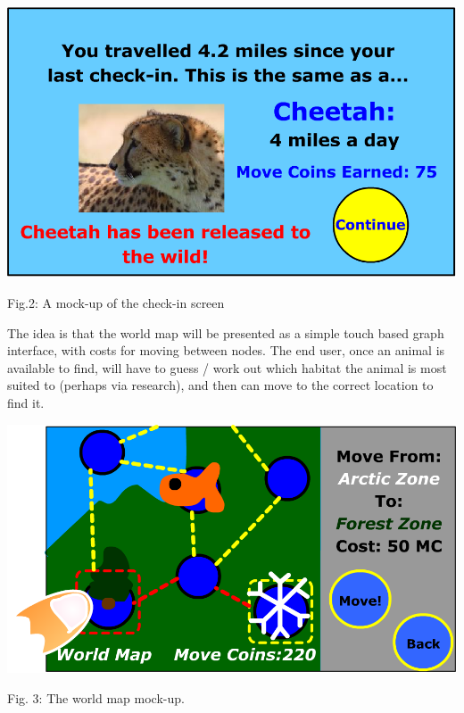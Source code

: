 \documentclass[]{article}
\begin{document}
\begin{center}
\includegraphics[scale=0.2]{checkin.png}

Fig.2: A mock-up of the check-in screen

\end{center}

The idea is that the world map will be presented as a simple touch based graph interface, with costs for moving between nodes. The end user, once an animal is available to find, will have to guess / work out which habitat the animal is most suited to (perhaps via research), and then can move to the correct location to find it.

\begin{center}
\includegraphics[scale=0.22]{worldmap.png}

Fig. 3: The world map mock-up.
\end{center}
\end{document}
